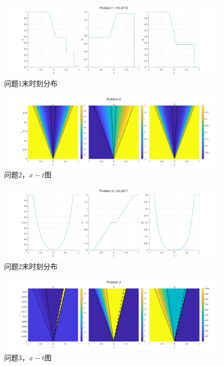 \documentclass[UTF8,zihao=5]{ctexart} %
\begin{document}
\begin{figure}[H]
    \centering
    \includegraphics[width=18cm]{p1_l.png}  %
    \caption{问题1末时刻分布}
    \label{fig:1b}
\end{figure}


\begin{figure}[H]
    \centering
    \includegraphics[width=18cm]{p2.png}  %
    \caption{问题2，$x-t$图}
    \label{fig:2a}
\end{figure}

\begin{figure}[H]
    \centering
    \includegraphics[width=18cm]{p2_l.png}  %
    \caption{问题2末时刻分布}
    \label{fig:2b}
\end{figure}

\begin{figure}[H]
    \centering
    \includegraphics[width=18cm]{p3.png}  %
    \caption{问题3，$x-t$图}
    \label{fig:3a}
\end{figure}
\end{document}
